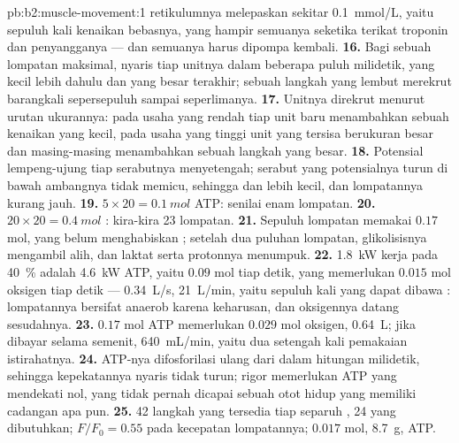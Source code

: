 \begin{solution}{pb:b2:muscle-movement:1}
retikulumnya melepaskan sekitar \qty{0.1}{mmol/L}, yaitu sepuluh kali
kenaikan bebasnya, yang hampir semuanya seketika terikat troponin dan
penyangganya --- dan semuanya harus dipompa kembali.
\textbf{16.} Bagi sebuah lompatan maksimal, nyaris tiap unitnya dalam
beberapa puluh milidetik, yang kecil lebih dahulu dan yang besar
terakhir; sebuah langkah yang lembut merekrut barangkali sepersepuluh
sampai seperlimanya.
\textbf{17.} Unitnya direkrut menurut urutan ukurannya: pada usaha yang
rendah tiap unit baru menambahkan sebuah kenaikan yang kecil, pada
usaha yang tinggi unit yang tersisa berukuran besar dan masing-masing
menambahkan sebuah langkah yang besar.
\textbf{18.} Potensial lempeng-ujung tiap serabutnya menyetengah;
serabut yang potensialnya turun di bawah ambangnya tidak memicu,
sehingga  dan  lebih kecil, dan lompatannya kurang
jauh.
\textbf{19.} $5\times 20 = \qty{0.1}{mol}$ ATP: senilai enam lompatan.
\textbf{20.} $20\times 20 = \qty{0.4}{mol}$ : kira-kira
23 lompatan.
\textbf{21.} Sepuluh lompatan memakai $0.17$ mol, yang belum
menghabiskan ; setelah dua puluhan lompatan,
glikolisisnya mengambil alih, dan laktat serta protonnya menumpuk.
\textbf{22.} \qty{1.8}{kW} kerja pada \qty{40}{\%} adalah \qty{4.6}{kW}
ATP, yaitu $0.09$ mol tiap detik, yang memerlukan $0.015$ mol oksigen
tiap detik --- \qty{0.34}{L/s}, \qty{21}{L/min}, yaitu sepuluh kali
yang dapat dibawa : lompatannya bersifat anaerob karena
keharusan, dan oksigennya datang sesudahnya.
\textbf{23.} $0.17$ mol ATP memerlukan $0.029$ mol oksigen,
\qty{0.64}{L}; jika dibayar selama semenit, \qty{640}{mL/min}, yaitu
dua setengah kali pemakaian istirahatnya.
\textbf{24.} ATP-nya difosforilasi ulang dari  dalam
hitungan milidetik, sehingga kepekatannya nyaris tidak turun; rigor
memerlukan ATP yang mendekati nol, yang tidak pernah dicapai sebuah
otot hidup yang memiliki cadangan apa pun.
\textbf{25.} 42 langkah yang tersedia tiap separuh , 24 yang
dibutuhkan; $F/F_0 = 0.55$ pada kecepatan lompatannya; $0.017$ mol,
\qty{8.7}{g}, ATP.
\end{solution}
